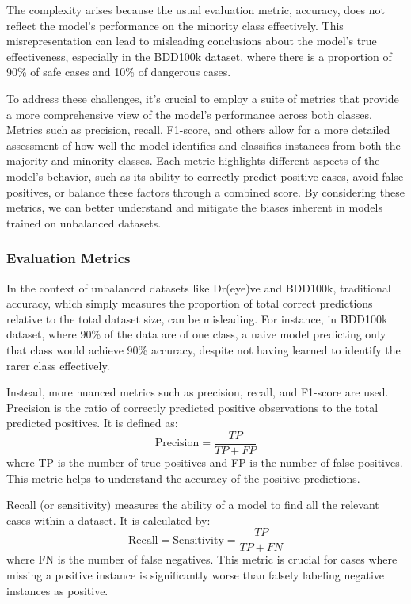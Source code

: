 The complexity arises because the usual evaluation metric, accuracy, does not 
reflect the model's performance on the minority class effectively. 
This misrepresentation can lead to misleading conclusions about the model's true 
effectiveness, especially in the BDD100k dataset, where there is a proportion 
of 90\% of safe cases and 10\% of dangerous cases.

To address these challenges, it's crucial to employ a suite of metrics that 
provide a more comprehensive view of the model’s performance across both classes. 
Metrics such as precision, recall, F1-score, and others allow for a more detailed 
assessment of how well the model identifies and classifies instances from both the 
majority and minority classes. Each metric highlights different aspects of the 
model's behavior, such as its ability to correctly predict positive cases, avoid 
false positives, or balance these factors through a combined score. 
By considering these metrics, we can better understand 
and mitigate the biases inherent in models trained on unbalanced datasets.

\subsubsection{Evaluation Metrics}
In the context of unbalanced datasets like Dr(eye)ve and BDD100k, traditional 
accuracy, which simply measures the proportion of total correct predictions 
relative to the total dataset size, can be misleading. For instance, in BDD100k 
dataset, where 90\% of the data are of one class, a naive model predicting only 
that class would achieve 90\% accuracy, despite not having learned to identify 
the rarer class effectively.

Instead, more nuanced metrics such as precision, recall, and F1-score are used. 
Precision is the ratio of correctly predicted positive observations to the total 
predicted positives. It is defined as:
\begin{equation*}
    \text{Precision} = \frac{TP}{TP + FP}
\end{equation*}
where TP is the number of true positives and FP is the number of false positives. 
This metric helps to understand the accuracy of the positive predictions.

Recall (or sensitivity) measures the ability of a model to find all the relevant 
cases within a dataset. It is calculated by:
\begin{equation*}
    \text{Recall} = \text{Sensitivity} = \frac{TP}{TP + FN}
\end{equation*}
where FN is the number of false negatives. This metric is crucial for cases where 
missing a positive instance is significantly worse than falsely labeling negative 
instances as positive.

